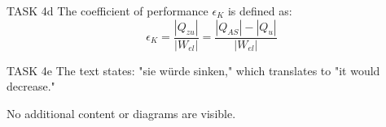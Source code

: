 TASK 4d  
The coefficient of performance \( \epsilon_K \) is defined as:  
\[
\epsilon_K = \frac{|Q_{zu}|}{|W_{el}|} = \frac{|Q_{AS}| - |Q_{u}|}{|W_{el}|}
\]  

TASK 4e  
The text states: "sie würde sinken," which translates to "it would decrease."  

No additional content or diagrams are visible.